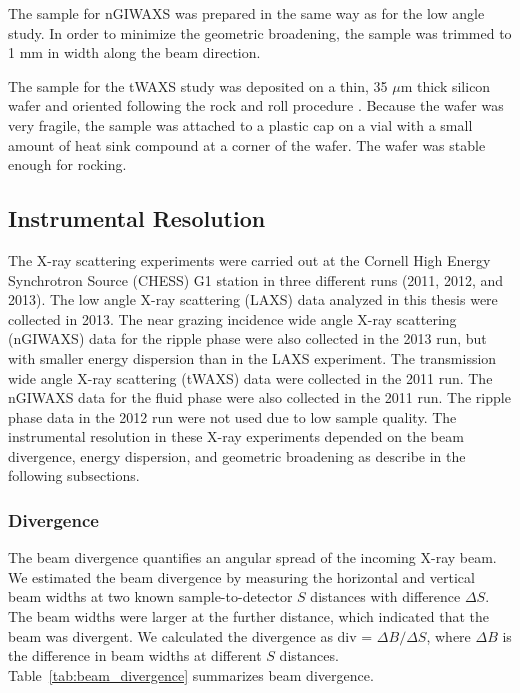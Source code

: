 The sample for nGIWAXS was prepared in the same way 
as for the low angle study. In order to minimize the geometric broadening, the 
sample was trimmed to 1 mm in width along the beam direction.

The sample for the tWAXS study was deposited on a thin, 35 $\mu$m thick silicon
wafer and oriented following the rock and roll procedure \cite{Tristram-Nagle07_MMB}.  
Because the wafer was very fragile, 
the sample was attached to a plastic cap on 
a vial with a small amount of heat sink compound at a corner of the 
wafer. The wafer was stable enough for rocking. 

\subsection{Instrumental Resolution}\label{sec:instrumental_resolution}
The X-ray scattering experiments were carried out at the Cornell 
High Energy Synchrotron Source (CHESS) G1 station in three different runs
(2011, 2012, and 2013). 
The low angle X-ray scattering (LAXS) data analyzed 
in this thesis were collected in 2013.
The near grazing incidence wide angle X-ray scattering (nGIWAXS) data
for the ripple phase were also collected
in the 2013 run, but with smaller energy dispersion than in the LAXS experiment.
The transmission wide angle X-ray scattering (tWAXS) data were collected
in the 2011 run. The nGIWAXS data for the fluid phase were also collected in
the 2011 run.
The ripple phase data in the 2012 run were not used
due to low sample quality.
The instrumental resolution in these X-ray experiments depended on the beam
divergence, energy dispersion, and geometric broadening 
as describe in the following subsections.

\subsubsection{Divergence}\label{sec:divergence}
The beam divergence quantifies an angular spread of the incoming X-ray
beam. We estimated the beam divergence by measuring the horizontal and 
vertical beam widths at two known sample-to-detector $S$ distances
with difference $\Delta S$. 
The beam widths were larger at the further distance, which indicated 
that the beam was divergent. 
We calculated the divergence as div = $\Delta B/\Delta S$, where
$\Delta B$ is the difference in beam widths at different $S$ distances.
Table~\ref{tab:beam_divergence} summarizes beam divergence.

